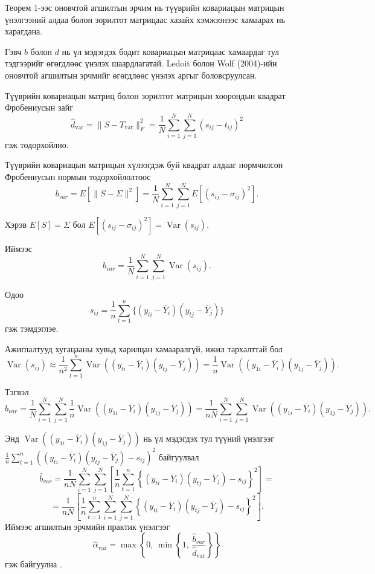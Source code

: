 Теорем 1-ээс оновчтой агшилтын
эрчим нь түүврийн ковариацын матрицын
үнэлгээний алдаа болон зорилтот
матрицаас хазайх хэмжээнээс
хамаарах нь харагдана.

Гэвч $b$ болон $d$ нь үл мэдэгдэх
бодит ковариацын матрицаас хамаардаг
тул тэдгээрийг өгөгдлөөс үнэлэх
шаардлагатай. Ledoit болон Wolf (2004)-ийн
оновчтой агшилтын
эрчмийг өгөгдлөөс үнэлэх аргыг
боловсруулсан.

Түүврийн ковариацын матриц болон
зорилтот матрицын хоорондын
квадрат Фробениусын зайг
\[
\widehat{d}_{\mathrm{var}}
=
\|S-T_{\mathrm{var}}\|_F^2
=
\frac{1}{N}\sum_{i=1}^{N}\sum_{j=1}^{N}
(s_{ij}-t_{ij})^2
\]
гэж тодорхойлно.

Түүврийн ковариацын матрицын хүлээгдэж буй
квадрат алдааг нормчилсон Фробениусын нормын
тодорхойлолтоос
\[
	b_{var}=E\left[\|S-\Sigma\|^2\right]=\frac{1}{N}
	\sum_{i=1}^{N}\sum_{j=1}^{N}
	E\left[(s_{ij}-\sigma_{ij})^2\right].
\]

Хэрэв $E[S]=\Sigma$ бол $E\left[(s_{ij}-\sigma_{ij})^2\right]
=
\operatorname{Var}(s_{ij}).$

Иймээс
\[
b_{var}
=
\frac{1}{N}
\sum_{i=1}^{N}\sum_{j=1}^{N}
\operatorname{Var}(s_{ij}).
\]

Одоо
\[
s_{ij}=\frac{1}{n}\sum_{t=1}^{n}\{(y_{ti}-\overline{Y}_i)
(y_{tj}-\overline{Y}_j)\}
\]
гэж тэмдэглэе.

Ажиглалтууд хугацааны хувьд
харилцан хамааралгүй, ижил тархалттай
бол
\[
	\operatorname{Var}(s_{ij})\approx
	\frac{1}{n^2}
	\sum_{t=1}^{n}\operatorname{Var}\left((y_{ti}-\overline{Y}_i)
	(y_{tj}-\overline{Y}_j)\right)=
	\frac{1}{n}\operatorname{Var}\left((y_{1i}-\overline{Y}_i)
	(y_{1j}-\overline{Y}_j)\right).
\]

Тэгвэл
\[
	b_{var}=\frac{1}{N}
	\sum_{i=1}^{N}\sum_{j=1}^{N}
	\frac{1}{n}\operatorname{Var}\left((y_{1i}-\overline{Y}_i)
	(y_{1j}-\overline{Y}_j)\right)=
	\frac{1}{nN}
	\sum_{i=1}^{N}\sum_{j=1}^{N}
	\operatorname{Var}\left((y_{1i}-\overline{Y}_i)
	(y_{1j}-\overline{Y}_j)\right).
\]

Энд $\operatorname{Var}\left((y_{1i}-\overline{Y}_i)
(y_{1j}-\overline{Y}_j)\right)$ нь
үл мэдэгдэх тул түүний үнэлгээг $\frac{1}{n}
\sum_{t=1}^{n}((y_{ti}-\overline{Y}_i)
(y_{tj}-\overline{Y}_j)-s_{ij})^2$ байгуулвал
\[
	\widehat{b}_{var}=
	\frac{1}{nN}
	\sum_{i=1}^{N}\sum_{j=1}^{N}
	\left[
	\frac{1}{n}\sum_{t=1}^{n}
	\left\{(y_{ti}-\overline{Y}_i)
	(y_{tj}-\overline{Y}_j)-s_{ij}\right\}^2
	\right]=
	\]
	\[=
	\frac{1}{nN}
	\left[
	\frac{1}{n}
	\sum_{t=1}^{n}
	\sum_{i=1}^{N}\sum_{j=1}^{N}
	\left\{(y_{ti}-\overline{Y}_i)
	(y_{tj}-\overline{Y}_j)-s_{ij}\right\}^2
	\right].
\]
Иймээс агшилтын эрчмийн
практик үнэлгээг
\[
\widehat{\alpha}_{\mathrm{var}}
	=
	\max\left\{
	0,\,
	\min\left\{
	1,\,
	\frac{\widehat{b}_{var}}
	{\widehat{d}_{\mathrm{var}}}
	\right\}
	\right\}
\]
гэж байгуулна \citep{ledoitwolf2004a}.


